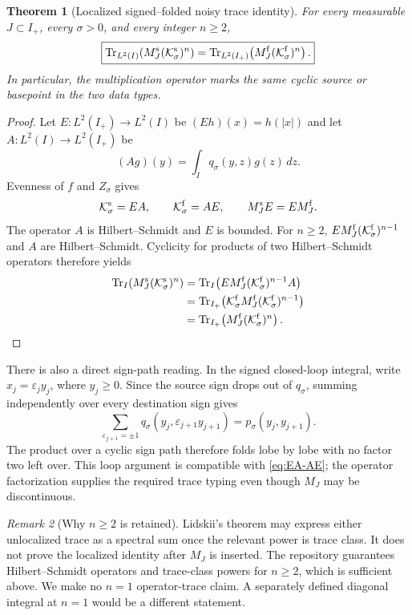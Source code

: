 \documentclass[11pt]{article}
\newtheorem{theorem}{Theorem}[section]
\theoremstyle{remark}
\newtheorem{remark}[theorem]{Remark}
\newcommand{\Tr}{\operatorname{Tr}}
\newcommand{\cK}{\mathcal K}
\begin{document}
\begin{theorem}[Localized signed--folded noisy trace identity]
\label{thm:noisy-folding}
For every measurable $J\subset I_+$, every $\sigma>0$, and every integer
$n\ge2$,
\begin{equation}\label{eq:noisy-folding}
 \boxed{
 \Tr_{L^2(I)}\!\left(M_J^{\rm s}(\cK_\sigma^{\rm s})^n\right)
 =
 \Tr_{L^2(I_+)}\!\left(M_J^{\rm f}(\cK_\sigma^{\rm f})^n\right).}
\end{equation}
In particular, the multiplication operator marks the same cyclic source or
basepoint in the two data types.
\end{theorem}

\begin{proof}
Let $E:L^2(I_+)\to L^2(I)$ be $(Eh)(x)=h(|x|)$ and let
$A:L^2(I)\to L^2(I_+)$ be
\[
 (Ag)(y)=\int_Iq_\sigma(y,z)g(z)\,dz.
\]
Evenness of $f$ and $Z_\sigma$ gives
\begin{equation}\label{eq:EA-AE}
 \cK_\sigma^{\rm s}=EA,
 \qquad
 \cK_\sigma^{\rm f}=AE,
 \qquad
 M_J^{\rm s}E=EM_J^{\rm f}.
\end{equation}
The operator $A$ is Hilbert--Schmidt and $E$ is bounded.  For $n\ge2$,
$EM_J^{\rm f}(\cK_\sigma^{\rm f})^{n-1}$ and $A$ are
Hilbert--Schmidt.  Cyclicity for products of two Hilbert--Schmidt operators
therefore yields
\begin{align*}
 \Tr_I\!\left(M_J^{\rm s}(\cK_\sigma^{\rm s})^n\right)
 &=\Tr_I\!\left(EM_J^{\rm f}(\cK_\sigma^{\rm f})^{n-1}A\right)\\
 &=\Tr_{I_+}\!\left(\cK_\sigma^{\rm f}M_J^{\rm f}
      (\cK_\sigma^{\rm f})^{n-1}\right)\\
 &=\Tr_{I_+}\!\left(M_J^{\rm f}(\cK_\sigma^{\rm f})^n\right).
\end{align*}
\end{proof}

There is also a direct sign-path reading.  In the signed closed-loop integral,
write $x_j=\varepsilon_jy_j$, where $y_j\ge0$.  Since the source sign drops
out of $q_\sigma$, summing independently over every destination sign gives
\[
 \sum_{\varepsilon_{j+1}=\pm1}
 q_\sigma(y_j,\varepsilon_{j+1}y_{j+1})
 =p_\sigma(y_j,y_{j+1}).
\]
The product over a cyclic sign path therefore folds lobe by lobe with no
factor two left over.  This loop argument is compatible with
\cref{eq:EA-AE}; the operator factorization supplies the required trace
typing even though $M_J$ may be discontinuous.

\begin{remark}[Why $n\ge2$ is retained]
Lidskii's theorem may express either unlocalized trace as a spectral sum once
the relevant power is trace class.  It does not prove the localized identity
after $M_J$ is inserted.  The repository guarantees Hilbert--Schmidt
operators and trace-class powers for $n\ge2$, which is sufficient above.
We make no $n=1$ operator-trace claim.  A separately defined diagonal
integral at $n=1$ would be a different statement.
\end{remark}
\end{document}
